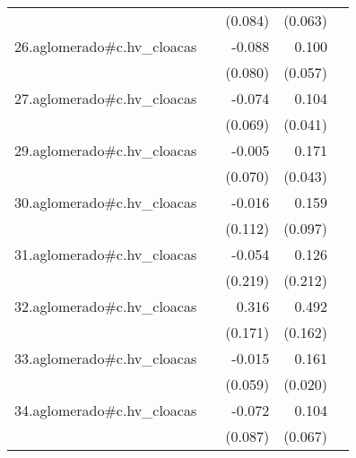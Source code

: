 {\begin{longtable}{l*{4}{D{.}{.}{-1}}}
            &                     &     (0.084)         &     (0.063)         &                     \\
\addlinespace
26.aglomerado#c.hv\_cloacas&                     &      -0.088         &       0.100         &                     \\
            &                     &     (0.080)         &     (0.057)         &                     \\
\addlinespace
27.aglomerado#c.hv\_cloacas&                     &      -0.074         &       0.104\sym{*}  &                     \\
            &                     &     (0.069)         &     (0.041)         &                     \\
\addlinespace
29.aglomerado#c.hv\_cloacas&                     &      -0.005         &       0.171\sym{***}&                     \\
            &                     &     (0.070)         &     (0.043)         &                     \\
\addlinespace
30.aglomerado#c.hv\_cloacas&                     &      -0.016         &       0.159         &                     \\
            &                     &     (0.112)         &     (0.097)         &                     \\
\addlinespace
31.aglomerado#c.hv\_cloacas&                     &      -0.054         &       0.126         &                     \\
            &                     &     (0.219)         &     (0.212)         &                     \\
\addlinespace
32.aglomerado#c.hv\_cloacas&                     &       0.316         &       0.492\sym{**} &                     \\
            &                     &     (0.171)         &     (0.162)         &                     \\
\addlinespace
33.aglomerado#c.hv\_cloacas&                     &      -0.015         &       0.161\sym{***}&                     \\
            &                     &     (0.059)         &     (0.020)         &                     \\
\addlinespace
34.aglomerado#c.hv\_cloacas&                     &      -0.072         &       0.104         &                     \\
            &                     &     (0.087)         &     (0.067)         &                     \\

\end{longtable}}
